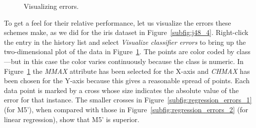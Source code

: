\begin{figure}[!ht]
\centering
{}
\newline
{}
\caption{\label{fig:regression_errors}Visualizing errors.}
\end{figure}


To get a feel for their relative performance, let us visualize the
errors these schemes make, as we did for the iris dataset in
Figure~\ref{subfig:j48_4}. Right-click the entry in the history list
and select \textit{Visualize classifier errors} to bring up the
two-dimensional plot of the data in
Figure~\ref{fig:regression_errors}. The points are color coded by
class---but in this case the color varies continuously because the
class is numeric. In Figure~\ref{fig:regression_errors} the
\textit{MMAX} attribute has been selected for the X-axis and
\textit{CHMAX} has been chosen for the Y-axis because this gives a
reasonable spread of points. Each data point is marked by a cross
whose size indicates the absolute value of the error for that
instance. The smaller crosses in
Figure~\ref{subfig:regression_errors_1} (for M5'), when compared with
those in Figure~\ref{subfig:regression_errors_2} (for linear
regression), show that M5' is superior.

